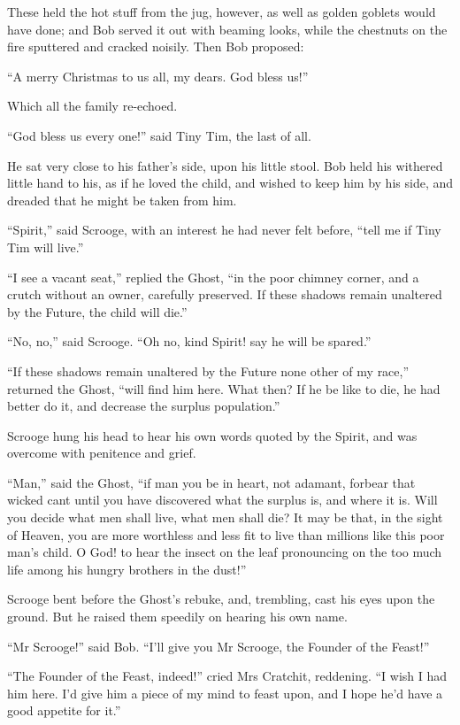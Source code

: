 \documentclass[paper=5.5in:8.5in,BCOR=7mm,twoside,DIV=calc,12pt,usegeometry]{scrbook} %
\begin{document}
These held the hot stuff from the jug, however, as well as golden goblets would have done; and Bob served it out with beaming looks, while the chestnuts on the fire sputtered and cracked noisily. Then Bob proposed:

\enquote{A merry Christmas to us all, my dears. God bless us!}

Which all the family re-echoed.

\enquote{God bless us every one!} said Tiny Tim, the last of all.

He sat very close to his father's side, upon his little stool. Bob held his withered little hand to his, as if he loved the child, and wished to keep him by his side, and dreaded that he might be taken from him.

\enquote{Spirit,} said Scrooge, with an interest he had never felt before, \enquote{tell me if Tiny Tim will live.}

\enquote{I see a vacant seat,} replied the Ghost, \enquote{in the poor chimney corner, and a crutch without an owner, carefully preserved. If these shadows remain unaltered by the Future, the child will die.}

\enquote{No, no,} said Scrooge. \enquote{Oh no, kind Spirit! say he will be spared.}

\enquote{If these shadows remain unaltered by the Future none other of my race,} returned the Ghost, \enquote{will find him here. What then? If he be like to die, he had better do it, and decrease the surplus population.}

Scrooge hung his head to hear his own words quoted by the Spirit, and was overcome with penitence and grief.

\enquote{Man,} said the Ghost, \enquote{if man you be in heart, not adamant, forbear that wicked cant until you have discovered what the surplus is, and where it is. Will you decide what men shall live, what men shall die? It may be that, in the sight of Heaven, you are more worthless and less fit to live than millions like this poor man's child. O God! to hear the insect on the leaf pronouncing on the too much life among his hungry brothers in the dust!}

Scrooge bent before the Ghost's rebuke, and, trembling, cast his eyes upon the ground. But he raised them speedily on hearing his own name.

\enquote{Mr Scrooge!} said Bob. \enquote{I'll give you Mr Scrooge, the Founder of the Feast!}

\enquote{The Founder of the Feast, indeed!} cried Mrs Cratchit, reddening. \enquote{I wish I had him here. I'd give him a piece of my mind to feast upon, and I hope he'd have a good appetite for it.}
\end{document}

